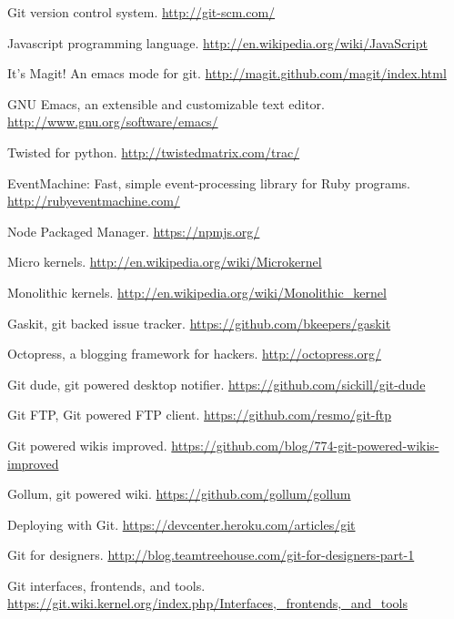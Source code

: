\cleardoublepage
{}
{}
\begin{thebibliography}{99}

 Git version control system.
  \url{http://git-scm.com/}

 Javascript programming language.
  \url{http://en.wikipedia.org/wiki/JavaScript}

 It's Magit! An emacs mode for git.
  \url{http://magit.github.com/magit/index.html}

 GNU Emacs, an extensible and customizable text editor.
  \url{http://www.gnu.org/software/emacs/}

 Twisted for python.
  \url{http://twistedmatrix.com/trac/}

 EventMachine: Fast, simple event-processing library for
  Ruby programs. \url{http://rubyeventmachine.com/}

 Node Packaged Manager.
  \url{https://npmjs.org/}

 Micro kernels.
  \url{http://en.wikipedia.org/wiki/Microkernel}

 Monolithic kernels.
  \url{http://en.wikipedia.org/wiki/Monolithic_kernel}

 Gaskit, git backed issue tracker.
  \url{https://github.com/bkeepers/gaskit}

 Octopress, a blogging framework for hackers.
  \url{http://octopress.org/}

 Git dude, git powered desktop notifier.
  \url{https://github.com/sickill/git-dude}

 Git FTP, Git powered FTP client.
  \url{https://github.com/resmo/git-ftp}

 Git powered wikis improved.
  \url{https://github.com/blog/774-git-powered-wikis-improved}

 Gollum, git powered wiki.
  \url{https://github.com/gollum/gollum}

 Deploying with Git.
  \url{https://devcenter.heroku.com/articles/git}

 Git for designers.
  \url{http://blog.teamtreehouse.com/git-for-designers-part-1}

 Git interfaces, frontends, and tools.
  \url{https://git.wiki.kernel.org/index.php/Interfaces,_frontends,_and_tools}


\end{thebibliography}
